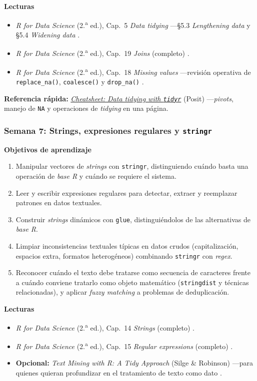 \documentclass[11pt,letterpaper]{article}
\newcommand{\semana}[2]{%
  \subsubsection*{\color{main}Semana #1: #2}%
}
\newcommand{\cheatsheet}[2]{%
  \href{https://rstudio.github.io/cheatsheets/#1.pdf}{\textit{Cheatsheet: #2}}%
}
\begin{document}
\medskip
\noindent\textbf{Lecturas}
\begin{itemize}[leftmargin=*, itemsep=1pt]
    \item \textit{R for Data Science} (2.\textsuperscript{a} ed.), Cap.\ 5 \textit{Data tidying} ---§5.3 \textit{Lengthening data} y §5.4 \textit{Widening data} \cite{wickham2023r4ds}.
    \item \textit{R for Data Science} (2.\textsuperscript{a} ed.), Cap.\ 19 \textit{Joins} (completo) \cite{wickham2023r4ds}.
    \item \textit{R for Data Science} (2.\textsuperscript{a} ed.), Cap.\ 18 \textit{Missing values} ---revisión operativa de \texttt{replace\_na()}, \texttt{coalesce()} y \texttt{drop\_na()} \cite{wickham2023r4ds}.
\end{itemize}

\medskip
\noindent\textbf{Referencia rápida:} \cheatsheet{tidyr}{Data tidying with \texttt{tidyr}} (Posit) ---\textit{pivots}, manejo de \texttt{NA} y operaciones de \textit{tidying} en una página.

\semana{7}{Strings, expresiones regulares y \texttt{stringr}}

\medskip
\noindent\textbf{Objetivos de aprendizaje}
\begin{enumerate}[leftmargin=*, itemsep=1pt]
    \item Manipular vectores de \textit{strings} con \texttt{stringr}, distinguiendo cuándo basta una operación de \textit{base R} y cuándo se requiere el sistema.
    \item Leer y escribir expresiones regulares para detectar, extraer y reemplazar patrones en datos textuales.
    \item Construir \textit{strings} dinámicos con \texttt{glue}, distinguiéndolos de las alternativas de \textit{base R}.
    \item Limpiar inconsistencias textuales típicas en datos crudos (capitalización, espacios extra, formatos heterogéneos) combinando \texttt{stringr} con \textit{regex}.
    \item Reconocer cuándo el texto debe tratarse como secuencia de caracteres frente a cuándo conviene tratarlo como objeto matemático (\texttt{stringdist} y técnicas relacionadas), y aplicar \textit{fuzzy matching} a problemas de deduplicación.
\end{enumerate}

\medskip
\noindent\textbf{Lecturas}
\begin{itemize}[leftmargin=*, itemsep=1pt]
    \item \textit{R for Data Science} (2.\textsuperscript{a} ed.), Cap.\ 14 \textit{Strings} (completo) \cite{wickham2023r4ds}.
    \item \textit{R for Data Science} (2.\textsuperscript{a} ed.), Cap.\ 15 \textit{Regular expressions} (completo) \cite{wickham2023r4ds}.
    \item \textbf{Opcional:} \textit{Text Mining with R: A Tidy Approach} (Silge \& Robinson) ---para quienes quieran profundizar en el tratamiento de texto como dato \cite{silge-tidytext}.
\end{itemize}
\end{document}
